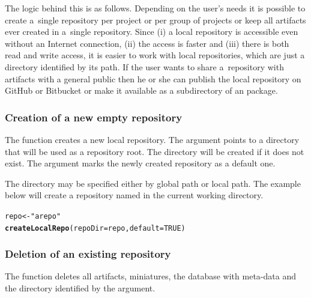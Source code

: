 \documentclass[nojss]{jss}\usepackage[]{graphicx}\usepackage[]{color}
\makeatletter
\newcommand{\hlnum}[1]{\textcolor[rgb]{0.686,0.059,0.569}{#1}}%
\newcommand{\hlstr}[1]{\textcolor[rgb]{0.192,0.494,0.8}{#1}}%
\newcommand{\hlstd}[1]{\textcolor[rgb]{0.345,0.345,0.345}{#1}}%
\newcommand{\hlkwb}[1]{\textcolor[rgb]{0.69,0.353,0.396}{#1}}%
\newcommand{\hlkwc}[1]{\textcolor[rgb]{0.333,0.667,0.333}{#1}}%
\newcommand{\hlkwd}[1]{\textcolor[rgb]{0.737,0.353,0.396}{\textbf{#1}}}%
\newenvironment{kframe}{%
 \def\at@end@of@kframe{}%
 \ifinner\ifhmode%
  \def\at@end@of@kframe{\end{minipage}}%
  \begin{minipage}{\columnwidth}%
 \fi\fi%
 \def\FrameCommand##1{\hskip\@totalleftmargin \hskip-\fboxsep
 \colorbox{shadecolor}{##1}\hskip-\fboxsep
     \hskip-\linewidth \hskip-\@totalleftmargin \hskip\columnwidth}%
 \MakeFramed {\advance\hsize-\width
   \@totalleftmargin\z@ \linewidth\hsize
   \@setminipage}}%
 {\par\unskip\endMakeFramed%
 \at@end@of@kframe}
\newenvironment{knitrout}{}{} %
\makeatother
\begin{document}
\clearpage

The logic behind this is as follows. 
Depending on the user’s needs it is possible to create a~single repository per project or per group of projects or keep all artifacts ever created in a~single repository. Since (i) a local repository is accessible even without an Internet connection, (ii) the access is faster and (iii) there is both read and write access, it is easier to work with local repositories, which are just a directory identified by its path. 
If the user wants to share a~repository with artifacts with a general public then he or she can publish the local repository on GitHub {or Bitbucket} or make it available as a subdirectory of an  package. 

\subsubsection{Creation of a new empty repository}

The  function creates a new local repository. The  argument points to a directory that will be used as a repository root. The directory will be created if it does not exist. The  argument marks the newly created repository as a default one.

The directory may be specified either by global path or local path. {The example below will create a repository named  in the current working directory.}

\begin{knitrout}
\color{fgcolor}\begin{kframe}
\begin{alltt}
\hlstd{repo} \hlkwb{<-} \hlstr{"arepo"}
\hlkwd{createLocalRepo}\hlstd{(}\hlkwc{repoDir} \hlstd{= repo,} \hlkwc{default} \hlstd{=} \hlnum{TRUE}\hlstd{)}
\end{alltt}
\end{kframe}
\end{knitrout}


\subsubsection{Deletion of an existing repository}

The  function deletes all artifacts, miniatures, the database with meta-data and the directory identified by the  argument.
\end{document}
